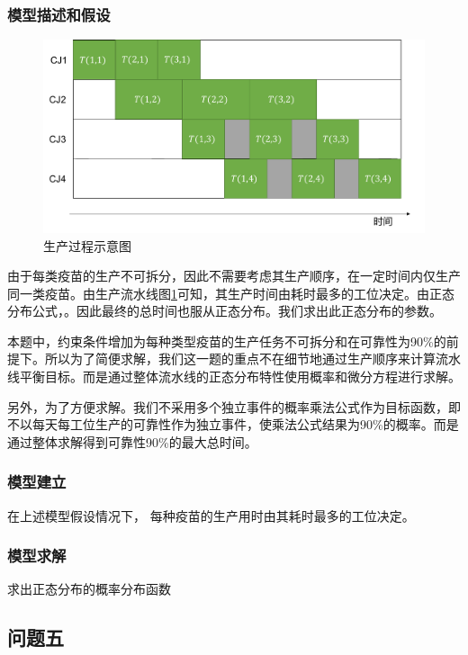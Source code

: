 \documentclass[UTF8]{ctexart}
\begin{document}
	\subsubsection{模型描述和假设}
	\begin{figure}[H]
		\centering %
		\includegraphics[scale=0.5]{pipe2.pdf}
		\caption{生产过程示意图}\label{pipeline2}
	\end{figure}
	由于每类疫苗的生产不可拆分，因此不需要考虑其生产顺序，在一定时间内仅生产同一类疫苗。由生产流水线图\ref{pipeline2}可知，其生产时间由耗时最多的工位决定。由正态分布公式，。因此最终的总时间也服从正态分布。我们求出此正态分布的参数。
	
	本题中，约束条件增加为每种类型疫苗的生产任务不可拆分和在可靠性为90\%的前提下。所以为了简便求解，我们这一题的重点不在细节地通过生产顺序来计算流水线平衡目标。而是通过整体流水线的正态分布特性使用概率和微分方程进行求解。
	
	另外，为了方便求解。我们不采用多个独立事件的概率乘法公式作为目标函数，即不以每天每工位生产的可靠性作为独立事件，使乘法公式结果为90\%的概率。而是通过整体求解得到可靠性90\%的最大总时间。
	\subsubsection{模型建立}
	在上述模型假设情况下，
	每种疫苗的生产用时由其耗时最多的工位决定。
	\subsubsection{模型求解}
	求出正态分布的概率分布函数
	\subsection{问题五}
\end{document}
